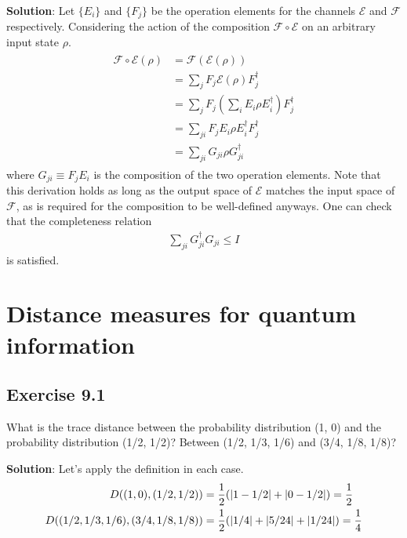 \documentclass{book}
\newcommand{\mc}[1]{\mathcal{#1}}
\begin{document}
    \textbf{Solution}: Let $\{E_i\}$ and $\{F_j\}$ be the operation elements for the channels $\mc{E}$ and $\mc{F}$ respectively. Considering the action of the composition $\mc{F} \circ \mc{E}$ on an arbitrary input state $\rho$.
    \begin{align}
    \begin{aligned}
        \mc{F}\circ\mc{E} (\rho) &= \mc{F}(\mc{E}(\rho)) \\
        &= \sum_j F_j \mc{E}(\rho) F_j^\dagger \\
        &= \sum_j F_j \left(\sum_i E_i \rho E_i^\dagger \right) F_j^\dagger \\
        &= \sum_{ji} F_j E_i \rho E_i^\dagger F_j^\dagger \\
        &= \sum_{ji} G_{ji} \rho G_{ji}^\dagger 
    \end{aligned}
    \end{align}
    where $G_{ji} \equiv F_j E_i$ is the composition of the two operation elements. Note that this derivation holds as long as the output space of $\mc{E}$ matches the input space of $\mc{F}$, as is required for the composition to be well-defined anyways. One can check that the completeness relation
    \begin{align}
        \sum_{ji}G_{ji}^\dagger G_{ji} \leq I 
    \end{align}
    is satisfied.

\chapter{Distance measures for quantum information}

\section*{Exercise 9.1}
    What is the trace distance between the probability distribution (1, 0) and the probability distribution (1/2, 1/2)? Between (1/2, 1/3, 1/6) and (3/4, 1/8, 1/8)?
    
    \textbf{Solution}: Let's apply the definition in each case.
    \begin{align}
    \begin{aligned}
        D((1,0), (1/2,1/2)) &= \frac{1}{2} (\abs{1-1/2}+\abs{0-1/2}) = \frac{1}{2}\\
        D((1/2,1/3,1/6), (3/4,1/8,1/8)) &= \frac{1}{2} (\abs{1/4} + \abs{5/24}+\abs{1/24}) = \frac{1}{4}
    \end{aligned}
    \end{align}
    
\end{document}
